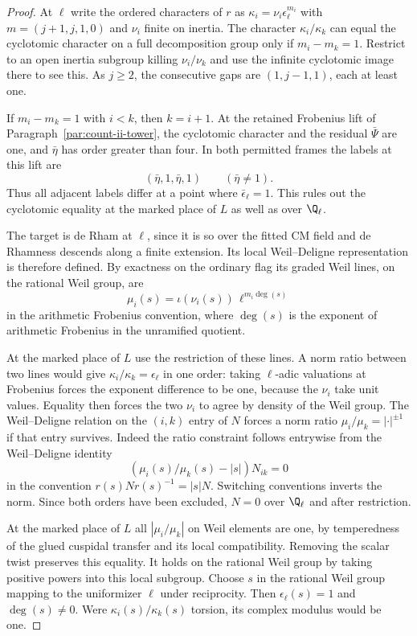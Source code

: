 \begin{proof}

At \(\ell\) write the ordered characters of \(r\) as
\(\kappa_i=\nu_i\epsilon_\ell^{m_i}\) with
\(m=(j+1,j,1,0)\) and \(\nu_i\) finite on inertia. The
character \(\kappa_i/\kappa_k\) can equal the cyclotomic
character on a full decomposition group only if
\(m_i-m_k=1\). Restrict to an open inertia subgroup
killing \(\nu_i/\nu_k\) and use the infinite cyclotomic image
there to see this. As \(j\ge2\), the consecutive gaps are
\((1,j-1,1)\), each at least one.

If \(m_i-m_k=1\) with
\(i<k\), then \(k=i+1\). At the retained Frobenius lift of
Paragraph~\ref{par:count-ii-tower}, the cyclotomic
character and the residual \(\bar\Psi\) are one, and
\(\bar\eta\) has order greater than four. In both permitted frames the labels at this lift are
\[
         (\bar\eta,1,\bar\eta,1)\qquad(\bar\eta\ne1).
\]
Thus all adjacent labels differ at a point where
\(\bar\epsilon_\ell=1\). This rules out the cyclotomic equality at the
marked place of \(L\) as well as over \(\Q_\ell\).

The target is de Rham at \(\ell\), since it is so over the
fitted CM field and de Rhamness descends along a finite
extension. Its local Weil--Deligne representation is
therefore defined. By exactness on the ordinary flag its
graded Weil lines, on the rational Weil group, are
\[
       \mu_i(s)=\iota(\nu_i(s))\,\ell^{m_i\deg(s)}
\]
in the arithmetic Frobenius convention, where \(\deg(s)\)
is the exponent of arithmetic Frobenius in the unramified
quotient.

At the marked place of \(L\) use the restriction
of these lines. A norm ratio between two lines would give
\(\kappa_i/\kappa_k=\epsilon_\ell\) in one order: taking
\(\ell\)-adic valuations at Frobenius forces the exponent
difference to be one, because the \(\nu_i\) take unit
values. Equality then forces the two \(\nu_i\) to agree
by density of the Weil group. The Weil--Deligne relation on the \((i,k)\) entry of \(N\)
forces a norm ratio \(\mu_i/\mu_k=|\cdot|^{\pm1}\) if
that entry survives. Indeed the ratio constraint follows entrywise from the Weil--Deligne identity
\[
 (\mu_i(s)/\mu_k(s)-|s|)N_{ik}=0
\]
in the convention \(r(s)Nr(s)^{-1}=|s|N\). Switching conventions inverts the norm. Since both orders have been excluded, \(N=0\) over \(\Q_\ell\) and after restriction.

At the marked place of \(L\) all \(|\mu_i/\mu_k|\) on
Weil elements are one, by temperedness of the glued
cuspidal transfer and its local compatibility. Removing
the scalar twist preserves this equality. It holds on the
rational Weil group by taking positive powers into this
local subgroup. Choose \(s\) in the rational Weil group
mapping to the uniformizer \(\ell\) under reciprocity. Then
\(\epsilon_\ell(s)=1\) and \(\deg(s)\ne0\). Were \(\kappa_i(s)/\kappa_k(s)\) torsion, its complex modulus
would be one.


\end{proof}
